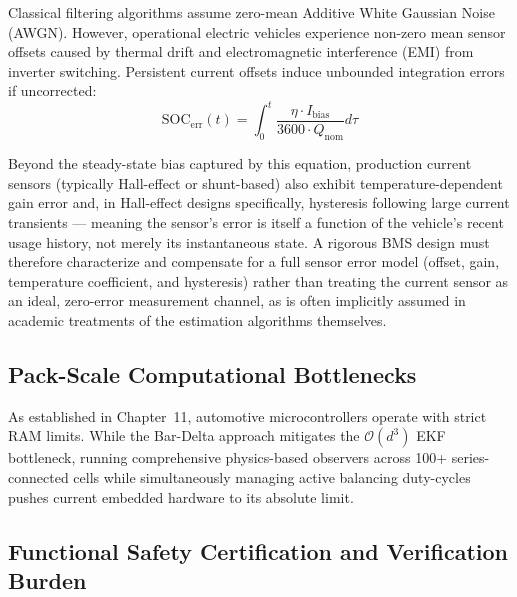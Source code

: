 Classical filtering algorithms assume zero-mean Additive White Gaussian Noise (AWGN). However, operational electric vehicles experience non-zero mean sensor offsets caused by thermal drift and electromagnetic interference (EMI) from inverter switching. Persistent current offsets induce unbounded integration errors if uncorrected:
\begin{equation}
\text{SOC}_{\text{err}}(t) = \int_0^t \frac{\eta \cdot I_{\text{bias}}}{3600 \cdot Q_{\text{nom}}} d\tau
\end{equation}

Beyond the steady-state bias captured by this equation, production current sensors (typically Hall-effect or shunt-based) also exhibit temperature-dependent gain error and, in Hall-effect designs specifically, hysteresis following large current transients — meaning the sensor's error is itself a function of the vehicle's recent usage history, not merely its instantaneous state. A rigorous BMS design must therefore characterize and compensate for a full sensor error model (offset, gain, temperature coefficient, and hysteresis) rather than treating the current sensor as an ideal, zero-error measurement channel, as is often implicitly assumed in academic treatments of the estimation algorithms themselves.

\subsection{Pack-Scale Computational Bottlenecks}
\label{subsec:14_pack_bottleneck}

As established in Chapter~11, automotive microcontrollers operate with strict RAM limits. While the Bar-Delta approach mitigates the $\mathcal{O}(d^3)$ EKF bottleneck, running comprehensive physics-based observers across 100+ series-connected cells while simultaneously managing active balancing duty-cycles pushes current embedded hardware to its absolute limit.

\subsection{Functional Safety Certification and Verification Burden}
\label{subsec:14_functional_safety}

